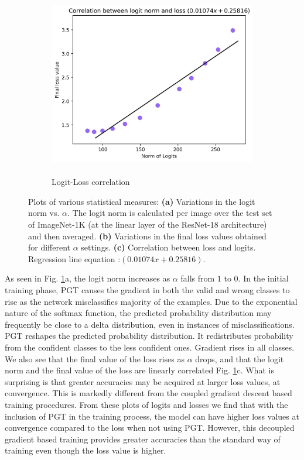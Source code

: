 \documentclass[times,sort&compress]{elsarticle}
\begin{document}
\begin{figure}[t]
\begin{subfigure}{.33\columnwidth}
\includegraphics[width=0.96\columnwidth]{logit_vs_loss}
\caption{\\Logit-Loss correlation}
\end{subfigure}
\caption{ Plots of various statistical measures: \textbf{(a)} Variations in the logit
norm vs. $\alpha$. The logit norm is calculated per image over the test set of
ImageNet-1K (at the linear layer of the ResNet-18 architecture) and then averaged.
\textbf{(b)} Variations in the final loss values obtained for different $\alpha$
settings. \textbf{(c)} Correlation between loss and logits. Regression line equation
:$(0.01074 x + 0.25816)$. }
\label{fig:stats}
\end{figure}





As seen in Fig. \ref{fig:stats}a, the logit norm increases as $\alpha$ falls from $1$ to
$0$. In the initial training phase, PGT causes the gradient in both the valid and wrong
classes to rise as the network misclassifies majority of the examples. Due to the
exponential nature of the softmax function, the predicted probability distribution may
frequently be close to a delta distribution, even in instances of misclassifications.
PGT reshapes the predicted probability distribution. It redistributes probability from
the confident classes to the less confident ones. Gradient rises in all classes. We also
see that the final value of the loss rises as $\alpha$ drops, and that the logit norm
and the final value of the loss are linearly correlated Fig. \ref{fig:stats}c. What is
surprising is that greater accuracies may be acquired at larger loss values, at
convergence. This is markedly different from the coupled gradient descent based training
procedures. From these plots of logits and losses we find that with the inclusion of PGT
in the training process, the model can have higher loss values at convergence compared
to the loss when not using PGT. However, this decoupled gradient based training provides
greater accuracies than the standard way of training even though the loss value is
higher.
\end{document}
